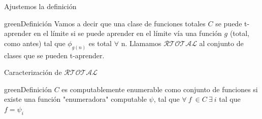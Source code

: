 \documentclass[10pt]{beamer}
\begin{document}
\begin{frame}{Ajustemos la definición}

\begin{mybox}{green}{Definición}
Vamos a decir que una clase de funciones totales $C$ se puede t-aprender en el límite si se puede aprender en el límite vía una función $g$ (total, como antes) tal que $\phi_{g(n)}$ es total $\forall$ n. Llamamos $\mathcal{RTOTAL}$ al conjunto de clases que se pueden t-aprender.
\end{mybox}


\end{frame}


\begin{frame}{Caracterización de $\mathcal{RTOTAL}$}

\begin{mybox}{green}{Definición}
$C$ es computablemente enumerable como conjunto de funciones si existe una función "enumeradora" computable $\psi$,
 tal que $\forall\ f\ \in C\ \exists\ i$ tal que $f = \psi_i$
\end{mybox}

\end{frame}
\end{document}
